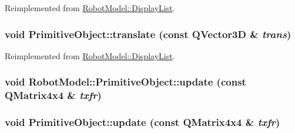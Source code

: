 Reimplemented from \hyperlink{class_robot_model_1_1_display_list_a6eb574d1f9929d9e2141dbacdeeb1b6a}{RobotModel::DisplayList}.\hypertarget{class_robot_model_1_1_primitive_object_ae41a1dcacd77b59c44409a77b0183a77}{
\subsubsection[{translate}]{\setlength{\rightskip}{0pt plus 5cm}void PrimitiveObject::translate (const QVector3D \& {\em trans})}}
\label{class_robot_model_1_1_primitive_object_ae41a1dcacd77b59c44409a77b0183a77}


Reimplemented from \hyperlink{class_robot_model_1_1_display_list_a6eb574d1f9929d9e2141dbacdeeb1b6a}{RobotModel::DisplayList}.\hypertarget{class_robot_model_1_1_primitive_object_ad6d1d0cfd2808ecf051a0d49689dfa86}{
\subsubsection[{update}]{\setlength{\rightskip}{0pt plus 5cm}void RobotModel::PrimitiveObject::update (const QMatrix4x4 \& {\em txfr})}}
\label{class_robot_model_1_1_primitive_object_ad6d1d0cfd2808ecf051a0d49689dfa86}
\hypertarget{class_robot_model_1_1_primitive_object_ac87b33448b7e82dddbca79f57ea8cbb5}{
\subsubsection[{update}]{\setlength{\rightskip}{0pt plus 5cm}void PrimitiveObject::update (const QMatrix4x4 \& {\em txfr})}}
\label{class_robot_model_1_1_primitive_object_ac87b33448b7e82dddbca79f57ea8cbb5}


